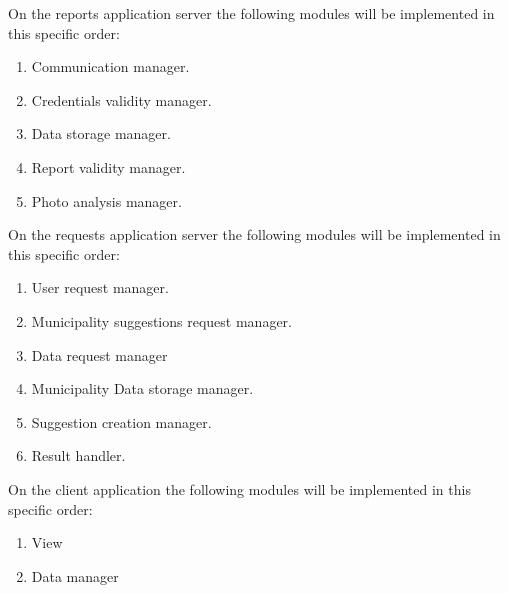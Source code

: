 \documentclass[titlepage]{article}
\begin{document}
On the reports application server the following modules will be implemented in this specific order:

\begin{enumerate}
	\item Communication manager.
	\item Credentials validity manager.
	\item Data storage manager.
	\item Report validity manager.
	\item Photo analysis manager.\\
\end{enumerate}


On the requests application server the following modules will be implemented in this specific order:

\begin{enumerate}
	\item User request manager.
	\item Municipality suggestions request manager.
	\item Data request manager
	\item Municipality Data storage manager.
	\item Suggestion creation manager.
	\item Result handler.\\
\end{enumerate}

On the client application the following modules will be implemented in this specific order:
\begin{enumerate}
	\item View
	\item Data manager
\end{enumerate}
\end{document}
